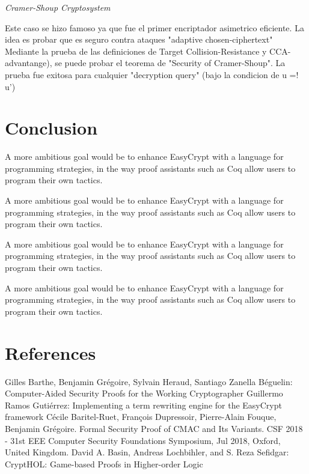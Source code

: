 \documentclass[runningheads,a4paper]{llncs}
\begin{document}
\centerline{\emph{Cramer-Shoup Cryptosystem}}

Este caso se hizo famoso ya que fue el primer encriptador asimetrico eficiente. La idea es probar que es seguro contra ataques "adaptive chosen-ciphertext"
Mediante la prueba de las definiciones de Target Collision-Resistance y CCA-advantange), se puede probar el teorema de "Security of Cramer-Shoup".
La prueba fue exitosa para cualquier "decryption query" (bajo la condicion de u =! u')\cite{article5}


\section{Conclusion}

A more ambitious goal
would be to enhance EasyCrypt with a language for programming strategies, in
the way proof assistants such as Coq allow users to program their own tactics.

A more ambitious goal
would be to enhance EasyCrypt with a language for programming strategies, in
the way proof assistants such as Coq allow users to program their own tactics.

A more ambitious goal
would be to enhance EasyCrypt with a language for programming strategies, in
the way proof assistants such as Coq allow users to program their own tactics.

A more ambitious goal
would be to enhance EasyCrypt with a language for programming strategies, in
the way proof assistants such as Coq allow users to program their own tactics.

\section{References}

\begin{thebibliography}{4}
Gilles Barthe, Benjamin Grégoire, Sylvain Heraud, Santiago Zanella Béguelin: Computer-Aided Security Proofs
for the Working Cryptographer
Guillermo Ramos Gutiérrez: Implementing a term rewriting
engine for the EasyCrypt framework
Cécile Baritel-Ruet, François Dupressoir, Pierre-Alain Fouque, Benjamin Grégoire. Formal Security
Proof of CMAC and Its Variants. CSF 2018 - 31st EEE Computer Security Foundations Symposium,
Jul 2018, Oxford, United Kingdom.
David A. Basin, Andreas Lochbihler, and S. Reza Sefidgar: CryptHOL: Game-based Proofs in
Higher-order Logic

\end{thebibliography}
\end{document}
